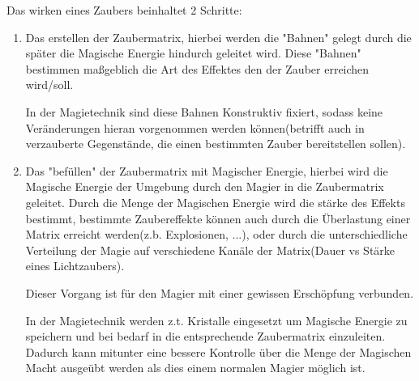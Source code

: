 Das wirken eines Zaubers beinhaltet 2 Schritte:\begin{enumerate}
\item Das erstellen der Zaubermatrix, hierbei werden die "Bahnen" gelegt durch die später die Magische Energie hindurch geleitet wird. Diese "Bahnen" bestimmen maßgeblich die Art des Effektes den der Zauber erreichen wird/soll.

In der Magietechnik sind diese Bahnen Konstruktiv fixiert, sodass keine Veränderungen hieran vorgenommen werden können(betrifft auch in verzauberte Gegenstände, die einen bestimmten Zauber bereitstellen sollen).
\item Das "befüllen" der Zaubermatrix mit Magischer Energie, hierbei wird die Magische Energie der Umgebung durch den Magier in die Zaubermatrix geleitet. Durch die Menge der Magischen Energie wird die stärke des Effekts bestimmt, bestimmte Zaubereffekte können auch durch die Überlastung einer Matrix erreicht werden(z.b. Explosionen, ...), oder durch die unterschiedliche Verteilung der Magie auf verschiedene Kanäle der Matrix(Dauer vs Stärke eines Lichtzaubers).

Dieser Vorgang ist für den Magier mit einer gewissen Erschöpfung verbunden.

In der Magietechnik werden z.t. Kristalle eingesetzt um Magische Energie zu speichern und bei bedarf in die entsprechende Zaubermatrix einzuleiten. Dadurch kann mitunter eine bessere Kontrolle über die Menge der Magischen Macht ausgeübt werden als dies einem normalen Magier möglich ist.
\end{enumerate}

